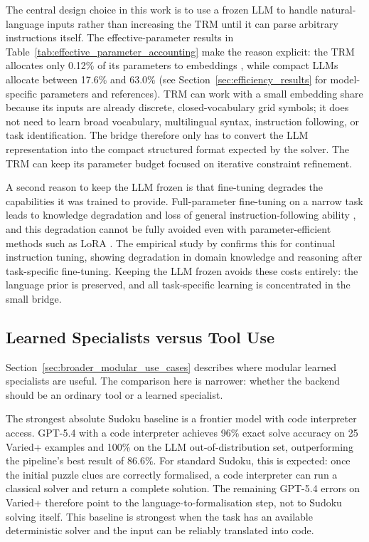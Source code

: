 \documentclass[11pt]{article}
\begin{document}
The central design choice in this work is to use a frozen LLM to handle natural-language inputs rather than increasing the TRM until it can parse arbitrary instructions itself.
The effective-parameter results in Table~\ref{tab:effective_parameter_accounting} make the reason explicit: the TRM allocates only 0.12\% of its parameters to embeddings \cite{jolicoeur-martineauLessMoreRecursive2025}, while compact LLMs allocate between 17.6\% and 63.0\% (see Section~\ref{sec:efficiency_results} for model-specific parameters and references).
TRM can work with a small embedding share because its inputs are already discrete, closed-vocabulary grid symbols; it does not need to learn broad vocabulary, multilingual syntax, instruction following, or task identification.
The bridge therefore only has to convert the LLM representation into the compact structured format expected by the solver.
The TRM can keep its parameter budget focused on iterative constraint refinement.

A second reason to keep the LLM frozen is that fine-tuning degrades the capabilities it was trained to provide.
Full-parameter fine-tuning on a narrow task leads to knowledge degradation and loss of general instruction-following ability \cite{ghoshCloserLookLimitations2024}, and this degradation cannot be fully avoided even with parameter-efficient methods such as LoRA \cite{kalajdzievskiScalingLawsForgetting2024}.
The empirical study by \citet{luoEmpiricalStudyCatastrophic2025} confirms this for continual instruction tuning, showing degradation in domain knowledge and reasoning after task-specific fine-tuning.
Keeping the LLM frozen avoids these costs entirely: the language prior is preserved, and all task-specific learning is concentrated in the small bridge.

\subsection{Learned Specialists versus Tool Use}
\label{sec:tool_vs_learned_specialist}
\label{sec:recursive_specialization_help}

Section~\ref{sec:broader_modular_use_cases} describes where modular learned specialists are useful.
The comparison here is narrower: whether the backend should be an ordinary tool or a learned specialist.

The strongest absolute Sudoku baseline is a frontier model with code interpreter access.
GPT-5.4 with a code interpreter achieves 96\% exact solve accuracy on 25 Varied+ examples and 100\% on the LLM out-of-distribution set, outperforming the pipeline's best result of 86.6\%.
For standard Sudoku, this is expected: once the initial puzzle clues are correctly formalised, a code interpreter can run a classical solver and return a complete solution.
The remaining GPT-5.4 errors on Varied+ therefore point to the language-to-formalisation step, not to Sudoku solving itself.
This baseline is strongest when the task has an available deterministic solver and the input can be reliably translated into code.
\end{document}

